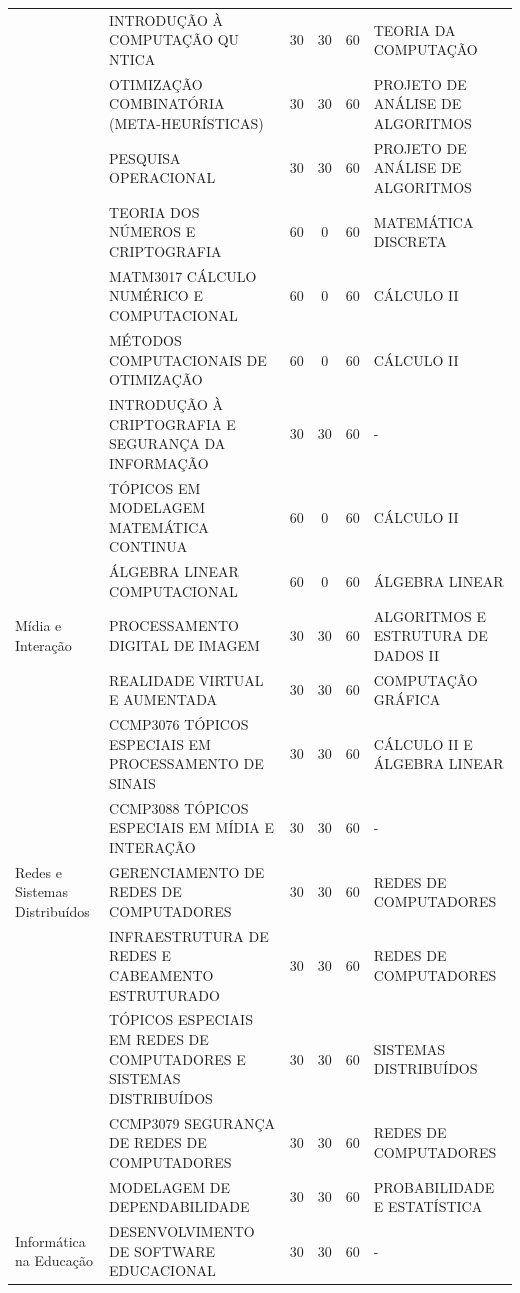 \documentclass[
	12pt,				%
	openright,			%
  oneside,     %
	a4paper,			%
 hyphens,
	chapter=TITLE,		%
	english,			%
	french,				%
	spanish,			%
	brazil				%
	]{abntex2}
\begin{document}
\begin{center}
\begin{tiny}
\begin{longtable}{p{2.5cm}p{5.5cm}cccp{3.3cm}}
      & INTRODUÇÃO À COMPUTAÇÃO QU NTICA & 30 & 30 & 60 & TEORIA DA COMPUTAÇÃO \\ \cline{2-6}
      & OTIMIZAÇÃO COMBINATÓRIA (META-HEURÍSTICAS) & 30 & 30 & 60 & PROJETO DE ANÁLISE DE ALGORITMOS \\ \cline{2-6}
      & PESQUISA OPERACIONAL & 30 & 30 & 60 & PROJETO DE ANÁLISE DE ALGORITMOS \\ \cline{2-6}
      & TEORIA DOS NÚMEROS E CRIPTOGRAFIA & 60 & 0 & 60 & MATEMÁTICA DISCRETA \\ \cline{2-6}
      & MATM3017 CÁLCULO NUMÉRICO E COMPUTACIONAL & 60 & 0 & 60 & CÁLCULO II \\ \cline{2-6}
      & MÉTODOS COMPUTACIONAIS DE OTIMIZAÇÃO & 60 & 0 & 60 & CÁLCULO II \\ \cline{2-6}
      & INTRODUÇÃO À CRIPTOGRAFIA E SEGURANÇA DA INFORMAÇÃO & 30 & 30 & 60 & - \\ \cline{2-6}
      & TÓPICOS EM MODELAGEM MATEMÁTICA CONTINUA & 60 & 0 & 60 & CÁLCULO II \\ \cline{2-6}
      & ÁLGEBRA LINEAR COMPUTACIONAL & 60 & 0 & 60 & ÁLGEBRA LINEAR \\ \midrule
    Mídia e Interação 
    & PROCESSAMENTO DIGITAL DE IMAGEM & 30 & 30 & 60 & ALGORITMOS E ESTRUTURA DE DADOS II \\ \cline{2-6}
    & REALIDADE VIRTUAL E AUMENTADA & 30 & 30 & 60 & COMPUTAÇÃO GRÁFICA \\ \cline{2-6}
      & CCMP3076 TÓPICOS ESPECIAIS EM PROCESSAMENTO DE SINAIS & 30 & 30 & 60 & CÁLCULO II E ÁLGEBRA LINEAR \\ \cline{2-6}
      & CCMP3088 TÓPICOS ESPECIAIS EM MÍDIA E INTERAÇÃO & 30 & 30 & 60 & - \\ \midrule
    Redes e Sistemas Distribuídos & GERENCIAMENTO DE REDES DE COMPUTADORES & 30 & 30 & 60 & REDES DE COMPUTADORES \\ \cline{2-6}
      & INFRAESTRUTURA DE REDES E CABEAMENTO ESTRUTURADO & 30 & 30 & 60 & REDES DE COMPUTADORES \\ \cline{2-6}
      & TÓPICOS ESPECIAIS EM REDES DE COMPUTADORES E SISTEMAS DISTRIBUÍDOS & 30 & 30 & 60 & SISTEMAS DISTRIBUÍDOS \\ \cline{2-6}
      & CCMP3079 SEGURANÇA DE REDES DE COMPUTADORES & 30 & 30 & 60 & REDES DE COMPUTADORES \\ \cline{2-6}
      & MODELAGEM DE DEPENDABILIDADE  & 30 & 30 & 60 & PROBABILIDADE E ESTATÍSTICA \\ \midrule
    Informática na Educação & DESENVOLVIMENTO DE SOFTWARE EDUCACIONAL & 30 & 30 & 60 & - \\ \cline{2-6}

\end{longtable}
\end{tiny}
\end{center}
\end{document}
